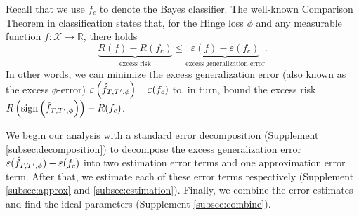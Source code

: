 \documentclass{article}
\def\RR{\mathbb R}
\begin{document}
Recall that we use $f_c$ to denote the Bayes classifier.
The well-known Comparison Theorem in classification \citep{zhang2004statistical} states that, for the Hinge loss $\phi$ and any measurable function $f:\mathcal{X}\rightarrow \RR$, there holds 
\begin{equation}
    \underbrace{R(f)-R(f_c)}_{\text{excess risk}} \leq \underbrace{\varepsilon(f) - \varepsilon(f_c)}_{\text{excess generalization error}}.   
\end{equation}
In other words, we can minimize the excess generalization error (also known as the excess $\phi$-error) $\varepsilon\left(\Hat{f}_{T, T^\prime,\phi}\right) - \varepsilon(f_c)$ to, in turn, bound the excess risk  $R\left(\text{sign}\left(\Hat{f}_{T, T^\prime,\phi}\right)\right)-R(f_c)$.

We begin our analysis with a standard error decomposition (Supplement \ref{subsec:decomposition}) to decompose the excess generalization error $\varepsilon(\Hat{f}_{T, T^\prime,\phi}) - \varepsilon(f_c)$ into two estimation error terms and one approximation error term. After that, we estimate each of these error terms respectively (Supplement \ref{subsec:approx} and \ref{subsec:estimation}). Finally, we combine the error estimates and find the ideal parameters (Supplement \ref{subsec:combine}).
\end{document}
